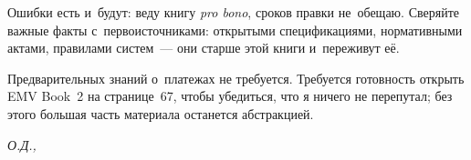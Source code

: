 Ошибки есть и~будут: веду книгу \textit{pro bono}, сроков правки не~обещаю.
Сверяйте важные факты с~первоисточниками: открытыми спецификациями,
нормативными актами, правилами систем~--- они старше этой книги и~переживут её.

Предварительных знаний о~платежах не требуется. Требуется готовность открыть
EMV Book~2 на странице~67, чтобы убедиться, что я ничего не перепутал; без
этого большая часть материала останется абстракцией.

\hfill\textit{О.Д., \the\year}

